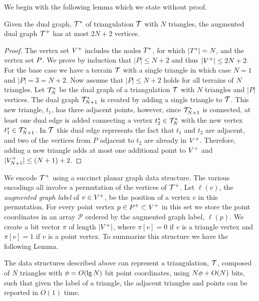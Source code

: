 We begin with the following lemma which we state without proof. 

\begin{lemma}\label{lem:points_for_dual}
Given the dual graph, $\mathcal{T}^*$ of triangulation $\mathcal{T}$ with 
$N$ triangles, the augmented dual graph $\mathcal{T}^+$ has at most $2N+2$ 
vertices.
\end{lemma}

%
\begin{proof}
The vertex set $V^+$ includes the nodes $T^*$, for which 
$|T^*| = N$, and the vertex set $P$. 
We prove by induction that $|P| \le N+2$ and thus $|V^+| \le 2N + 2$. 
For the base case we have a terrain $\mathcal{T}$ with a single triangle in which case 
$N = 1$ and $|P| = 3  = N + 2$. 
Now assume that $|P| \le N + 2$ holds for all terrains of $N$ triangles. 
Let $\mathcal{T}^*_N$ be the dual graph of a triangulation $\mathcal{T}$ with $N$ 
triangles and $|P|$ vertices. 
The dual graph $\mathcal{T}^*_{N+1}$ is created by adding a single triangle 
to $\mathcal{T}$. This new triangle, $t_1$, has three adjacent points, however, 
since $\mathcal{T}^*_{N+1}$ is connected, at least one dual edge is added 
connecting a vertex $t^*_2 \in \mathcal{T}^*_N$ with the new vertex 
$t^*_1 \in \mathcal{T}^*_{N+1}$. 
In $\mathcal{T}$ this dual edge represents the fact that $t_1$ and $t_2$ are 
adjacent, and two of the vertices from $P$ adjacent to $t_2$ are already 
in $V^+$. Therefore, adding a new triangle adds at most one 
additional point to $V^+$ and $|V^+_{N+1}| \le (N+1) + 2$.
\end{proof}

We encode $\mathcal{T}^+$ using a succinct planar graph data structure.
The various encodings all involve a permutation of the vertices of 
$\mathcal{T}^+$.
Let $\ell(v)$, the \emph{augmented graph label} of $v \in V^+$, be 
the position of a vertex $v$ in this permutation. 
For every point vertex $p \in P^+ \subset V^+$ in this set 
we store the point coordinates in an array $\mathcal{P}$ ordered by the 
augmented graph label, $\ell(p)$. 
We create a bit vector $\pi$ of length $|V^+|$, where 
$\pi[v] = 0$ if $v$ is a triangle vertex and $\pi[v] = 1$ if $v$ is a 
point vertex. 
To summarize this structure we have the following Lemma.

\begin{lemma}\label{lem:terrain_space}
The data structures described above can represent a triangulation, $\mathcal{T}$, composed 
of $N$ triangles with $\phi = O(\lg{N})$ bit point coordinates, using 
$N\phi + O(N)$ bits, such that given the label of a triangle, the adjacent
 triangles and points can be reported in $O(1)$ time.
\end{lemma}

